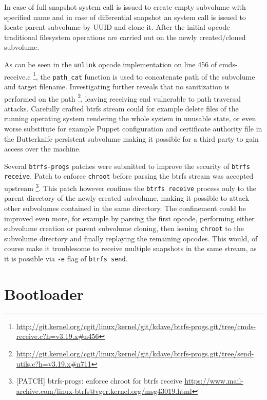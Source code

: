 \documentclass[a4paper,11pt]{kth-mag}
\begin{document}
In case of full snapshot system call is issued to
create empty subvolume with specified name and
in case of differential snapshot an system call is issued
to locate parent subvolume by UUID and clone it.
After the initial opcode traditional filesystem
operations are carried out on the newly
created/cloned subvolume.

As can be seen in the \lstinline!unlink! opcode
implementation on line 456 of cmds-receive.c
\footnote{\url{http://git.kernel.org/cgit/linux/kernel/git/kdave/btrfs-progs.git/tree/cmds-receive.c?h=v3.19.x\#n456}},
the \lstinline!path_cat! function is used to concatenate
path of the subvolume and target filename.
Investigating further reveals that no sanitization is performed on the path
\footnote{\url{http://git.kernel.org/cgit/linux/kernel/git/kdave/btrfs-progs.git/tree/send-utils.c?h=v3.19.x\#n711}}, leaving receiving end vulnerable to path traversal attacks.
Carefully crafted \acrshort{btrfs} stream could for example delete files
of the running operating system rendering the whole system
in unusable state, or even worse substitute for example
Puppet configuration and certificate authority file in the
Butterknife persistent subvolume making it possible for a third party
to gain access over the machine.

Several \lstinline!btrfs-progs! patches were submitted to improve
the security of \lstinline!btrfs receive!.
Patch to enforce \lstinline!chroot!
before parsing the \acrshort{btrfs} stream was accepted upstream
\footnote{
[PATCH] btrfs-progs: enforce chroot for btrfs receive
\url{https://www.mail-archive.com/linux-btrfs@vger.kernel.org/msg43019.html}}.
This patch however confines the \lstinline!btrfs receive!
process only to the parent directory of the newly created subvolume,
making it possible to attack other subvolumes contained in the same directory.
The confinement could be improved even more, for example
by parsing the first opcode, performing either
subvolume creation or parent subvolume cloning,
then issuing \lstinline!chroot! to the subvolume directory
and finally replaying the remaining opcodes.
This would, of course make it troublesome to receive multiple
snapshots in the same stream, as it is possible via \lstinline!-e!
flag of \lstinline!btrfs send!.



\section{Bootloader}
\end{document}

